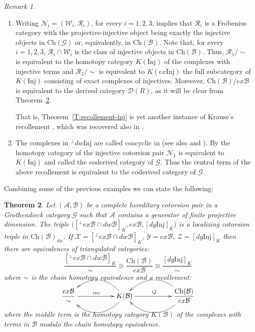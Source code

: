 \documentclass[11pt,a4paper,reqno]{amsart}
\newcommand{\A}{\mathcal{A}}
\newcommand{\B}{\mathcal{B}}
\newcommand{\D}{\mathcal{D}}
\newcommand{\G}{\mathcal{G}}
\newcommand{\N}{\mathcal{N}}
\newcommand{\R}{\mathcal{R}}
\newcommand{\X}{\mathcal{X}}
\newcommand{\Y}{\mathcal{Y}}
\newcommand{\W}{\mathcal{W}}
\newcommand{\Z}{\mathcal{Z}}
\newcommand{\Ch}{\mathrm{Ch}}
\newcommand{\Inj}{\mathrm{Inj}}
\theoremstyle{plain}
\newtheorem{thm}{Theorem}[section]
\theoremstyle{definition}
\theoremstyle{remark}
\newtheorem{rem}[thm]{Remark}
\begin{document}
%
%

\begin{rem}\label{R:inj-recoll}
\begin{enumerate}
{\,}
\item Writing $\N_i=(\W_i, \R_i)$, for every $i=1,2,3$, \cite[Proposition 3.2]{G7} implies that $\R_i$ is a Frobenius category with the projective-injective object being exactly  the injective objects in $\Ch(\G)$ or, equivalently, in $\Ch(\B)$. Note that, for every $i=1,2,3$,  $\R_i\cap\W_i$ is the class of injective objects in $\Ch(\B)$. Thus, $\R_1/\sim$ is equivalent to the  homotopy category $K(\Inj)$ of the complexes with injective terms and $\R_2 /\sim$ is equivalent to $K(ex\Inj)$ the full subcategory of $K(\Inj)$ consisting of exact complexes of injectives. Moreover, $\Ch(\B)/ex\B$ is equivalent to the derived category $\D(R)$, as it will be clear from Theorem~\ref{T:triple-B}.

 That is, Theorem~\ref{T:recollement-inj} is yet another instance of Krause's recollement \cite{Kr05}, which was recovered also in \cite{Beck14}.

\item The complexes in ${}^\perp{} dw \Inj$ are called coacyclic in \cite{Pos} (see also \cite{Stopurity} and \cite{Beck14}). By \cite[Proposition 6.9]{Stopurity} the homotopy category of the injective cotorsion pair $\N_1$ is equivalent to $K(\Inj)$ and called the coderived category of $\G$. Thus the central term of the above recollement is equivalent to the coderived category of $\G$.
\end{enumerate}
\end{rem}
%
%
%
%
%
%
%
Combining some of the previous examples we can state the following:
\begin{thm}\label{T:triple-B}  Let $(\A, \B)$ be a complete hereditary cotorsion pair in a  Grothendieck category $\G$ such that $\A$ contains a generator of finite projective dimension.
The triple $\Big([{}^\perp{} ex\B\cap dw \B]_K, ex\B, [dg \Inj]_K\Big)$ is a localizing cotorsion triple in $\Ch(\B)_{dw}$. If  $\X=[{}^\perp{} ex\B\cap dw \B]_K$, $\Y=ex\B$, $\Z=[dg \Inj]_K$ then there are equivalences of triangulated categories:
\[\frac{[{}^\perp{} ex\B\cap dw \B]_K}{\sim} \cong \frac{\Ch(\B)}{ex\B} \cong  \frac{[dg \Inj]_K}{\sim}\]
where $\sim$ is the chain homotopy equivalence
and a recollement:
\vskip0.7cm
\[
\xymatrix{\dfrac{ex\B}{\sim} \ar[rr]^{inc} &&{K(\B)} \ar@/^2pc/[ll]\ar@/_2pc/[ll] \ar[rr]^{Q}
&&{\dfrac{\Ch(\B)}{ex\B }}\ar@/^2pc/ [ll] \ar@/_2pc/ [ll] }
\]
\vskip0.7cm
where the middle term is  the homotopy category $K(\B)$ of the complexes with terms in $\B$ modulo the chain homotopy equivalence.

\end{thm}
\end{document}
